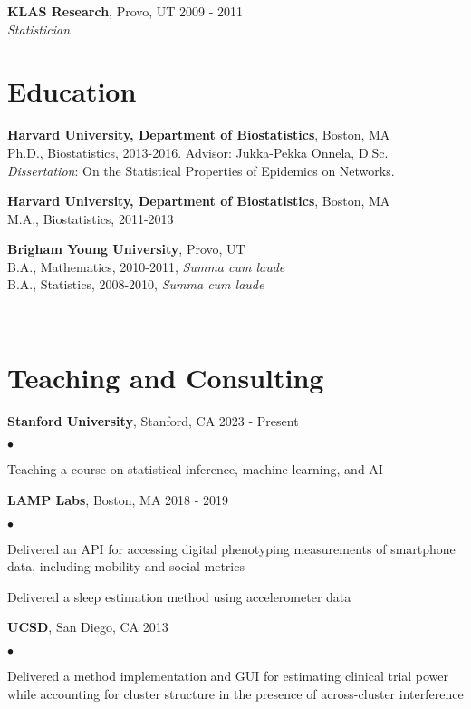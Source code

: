 \documentclass[margin,line]{res}
\newenvironment{bulletlist}{
  \begin{list}{$\bullet$}{%
      \setlength{\itemsep}{0cm}
      \setlength{\parsep}{0cm}
      \setlength{\parskip}{0cm}
      \setlength{\topsep}{0cm}
      \setlength{\partopsep}{0cm}
      \setlength{\leftmargin}{0.15in}
      \setlength{\labelwidth}{0.05in}
      \setlength{\labelsep}{0.1in}
      \setlength{\itemindent}{0in}
      \setlength{\rightmargin}{0in}}}
  {\end{list}}
\begin{document}
\begin{resume}
{\bf KLAS Research}, Provo, UT  \hfill 2009 - 2011\\
\textit{Statistician} \\[.15cm]

\pagebreak
\section{\sc Education}
{\bf Harvard University, Department of Biostatistics}, Boston, MA \\
Ph.D., Biostatistics, 2013-2016. Advisor: Jukka-Pekka Onnela, D.Sc. \\
\textit{Dissertation}: On the Statistical Properties of Epidemics on Networks.

{\bf Harvard University, Department of Biostatistics}, Boston, MA \\
M.A., Biostatistics, 2011-2013

{\bf Brigham Young University}, Provo, UT \\
B.A., Mathematics, 2010-2011, \textit{Summa cum laude} \\
B.A., Statistics, 2008-2010, \textit{Summa cum laude}

\ \\[-.75cm]
\section{\sc Teaching and Consulting}
{\bf Stanford University}, Stanford, CA  \hfill 2023 - Present\\[-.35cm]
\begin{bulletlist}
\item Teaching a course on statistical inference, machine learning, and AI
\end{bulletlist}

{\bf LAMP Labs}, Boston, MA  \hfill 2018 - 2019\\[-.35cm]
\begin{bulletlist}
\item Delivered an API for accessing digital phenotyping measurements of smartphone data, including mobility and social metrics
\item Delivered a sleep estimation method using accelerometer data
\end{bulletlist}

{\bf UCSD}, San Diego, CA  \hfill 2013\\[-.35cm]
\begin{bulletlist}
\item Delivered a method implementation and GUI for estimating clinical trial power while accounting for cluster structure in the presence of across-cluster interference
\end{bulletlist}


\end{resume}
\end{document}
